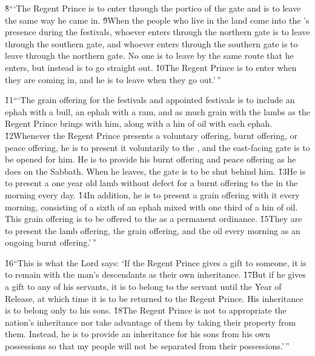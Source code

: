 \v{8}```The Regent Prince is to enter through the portico of the gate and is to leave the same way he came in. \v{9}When the people who live in the land come into the 's presence during the festivals, whoever enters through the northern gate is to leave through the southern gate, and whoever enters through the southern gate is to leave through the northern gate. No one is to leave by the same route that he enters, but instead is to go straight out. \v{10}The Regent Prince is to enter when they are coming in, and he is to leave when they go out.'\,''

\v{11}```The grain offering for the festivals and appointed festivals is to include an ephah with a bull, an ephah with a ram, and as much grain with the lambs as the Regent Prince brings with him, along with a hin of oil with each ephah. \v{12}Whenever the Regent Prince presents a voluntary offering, burnt offering, or peace offering, he is to present it voluntarily to the , and the east-facing gate is to be opened for him. He is to provide his burnt offering and peace offering as he does on the Sabbath. When he leaves, the gate is to be shut behind him. \v{13}He is to present a one year old lamb without defect for a burnt offering to the  in the morning every day. \v{14}In addition, he is to present a grain offering with it every morning, consisting of a sixth of an ephah mixed with one third of a hin of oil. This grain offering is to be offered to the  as a permanent ordinance. \v{15}They are to present the lamb offering, the grain offering, and the oil every morning as an ongoing burnt offering.'\,''

\v{16}``This is what the Lord  says: `If the Regent Prince gives a gift to someone, it is to remain with the man's descendants as their own inheritance. \v{17}But if he gives a gift to any of his servants, it is to belong to the servant until the Year of Release, at which time it is to be returned to the Regent Prince. His inheritance is to belong only to his sons. \v{18}The Regent Prince is not to appropriate the nation's inheritance nor take advantage of them by taking their property from them. Instead, he is to provide an inheritance for his sons from his own possessions so that my people will not be separated from their possessions.'\,''

